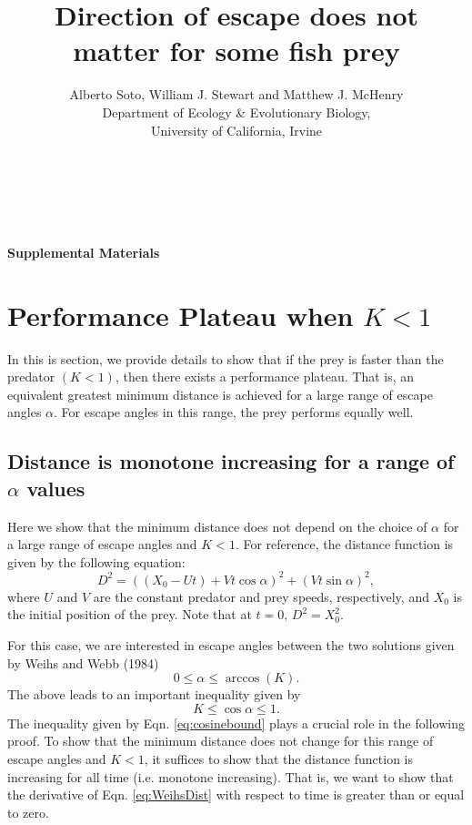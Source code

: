 \documentclass[12pt]{article}
\title{Direction of escape does not matter for some fish prey}
\author{Alberto Soto, William J. Stewart and Matthew J. McHenry\\
  Department of Ecology \& Evolutionary Biology,\\
  University of California, Irvine\\ \\ \\ \\}
\begin{document}

{\Large \textbf{Supplemental Materials}}


\section{Performance Plateau when $K < 1$}
In this is section, we provide details to show that if the prey is faster than the predator $(K<1)$, then there exists a performance plateau. That is, an equivalent greatest minimum distance is  achieved for a large range of escape angles $\alpha$. For escape angles in this range, the prey performs equally well.   

\subsection{Distance is monotone increasing for a range of $\alpha$ values}
Here we show that the minimum distance does not depend on the choice of $\alpha$ for a large range of escape angles and $K<1$. For reference, the distance function is given by the following equation:
%
\begin{equation}
D^2 = ((X_0 - Ut) + Vt\cos\alpha)^2 + (Vt\sin\alpha)^2,
\label{eq:WeihsDist}
\end{equation}
%
where $U$ and $V$ are the constant predator and prey speeds, respectively, and $X_0$ is the initial position of the prey. Note that at $t=0$, $D^2 = X_0^2.$ 

For this case, we are interested in escape angles between the two solutions given by Weihs and Webb (1984)
%
\begin{equation}
0 \leq \alpha \leq \arccos(K).
\label{alpharange}
\end{equation}
The above leads to an important inequality given by
\begin{equation}
K \leq \cos\alpha \leq 1.
\label{eq:cosinebound}
\end{equation} 
The inequality given by Eqn. \ref{eq:cosinebound} plays a crucial role in the following proof. To show that the minimum distance does not change for this range of escape angles and $K<1$, it suffices to show that the distance function is increasing for all time (i.e. monotone increasing). That is, we want to show that the derivative of Eqn. \ref{eq:WeihsDist} with respect to time is greater than or equal to zero. 
\end{document}
